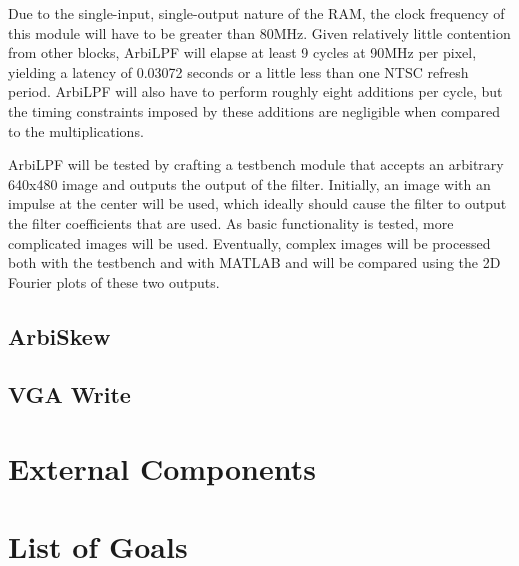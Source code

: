 \documentclass{article}
\begin{document}
Due to the single-input, single-output nature of the RAM, the clock frequency of this module will have to be greater than 80MHz. Given relatively little contention from other blocks, ArbiLPF will elapse at least 9 cycles at 90MHz per pixel, yielding a latency of 0.03072 seconds or a little less than one NTSC refresh period. ArbiLPF will also have to perform roughly eight additions per cycle, but the timing constraints imposed by these additions are negligible when compared to the multiplications.

ArbiLPF will be tested by crafting a testbench module that accepts an arbitrary 640x480 image and outputs the output of the filter. Initially, an image with an impulse at the center will be used, which ideally should cause the filter to output the filter coefficients that are used. As basic functionality is tested, more complicated images will be used. Eventually, complex images will be processed both with the testbench and with MATLAB and will be compared using the 2D Fourier plots of these two outputs.

\subsection{ArbiSkew}

\subsection{VGA Write}

\section{External Components}

\section{List of Goals}
\end{document}
